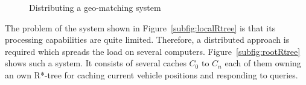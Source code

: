 \begin{figure}[htbp]
\centering
{}
\caption{Distributing a geo-matching system}\label{fig:DistributedRtree}
\end{figure}

The problem of the system shown in Figure~\ref{subfig:localRtree} is
that its processing capabilities are quite limited. Therefore, a
distributed approach is required which spreads the load on several
computers. Figure~\ref{subfig:rootRtree} shows such a system. It
consists of several caches $C_0$ to $C_n$ each of them owning an own
R*-tree for caching current vehicle positions and responding to
queries.

